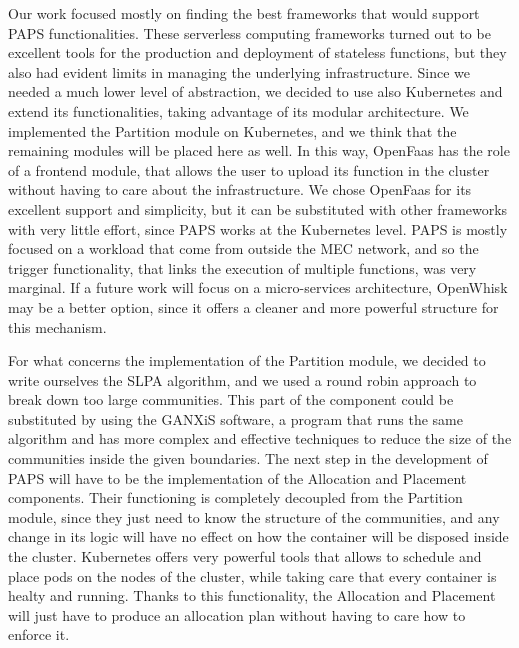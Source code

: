 Our work focused mostly on finding the best frameworks that would support PAPS functionalities.
These serverless computing frameworks turned out to be excellent tools for the production
and deployment of stateless functions, but they also had evident limits in managing the underlying
infrastructure.
Since we needed a much lower level of abstraction, we decided to use also Kubernetes and extend
its functionalities, taking advantage of its modular architecture.
We implemented the Partition module on Kubernetes, and we think that the remaining modules will
be placed here as well. In this way, OpenFaas has the role of a frontend module, that allows
the user to upload its function in the cluster without having to care about the infrastructure.
We chose OpenFaas for its excellent support and simplicity, but it can be substituted with other frameworks
with very little effort, since PAPS works at the Kubernetes level.
PAPS is mostly focused on a workload that come from outside the MEC network, and so the trigger functionality,
that links the execution of multiple functions, was very marginal.
If a future work will focus on a micro-services architecture, OpenWhisk may be
a better option, since it offers a cleaner and more powerful structure for this mechanism.
\par
For what concerns the implementation of the Partition module, we decided to write ourselves 
the SLPA algorithm, and we used a round robin approach to break down too large communities.
This part of the component could be substituted by using the GANXiS software, a program
that runs the same algorithm and has more complex and effective techniques to reduce
the size of the communities inside the given boundaries.
The next step in the development of PAPS will have to be the implementation of the Allocation 
and Placement components. Their functioning is completely decoupled from the Partition module,
since they just need to know the structure of the communities, and any change in its logic
will have no effect on how the container will be disposed inside the cluster.
Kubernetes offers very powerful tools that allows to schedule and place pods on the nodes of the cluster,
while taking care that every container is healty and running. Thanks to this functionality,
the Allocation and Placement will just have to produce an allocation plan without having to
care how to enforce it.